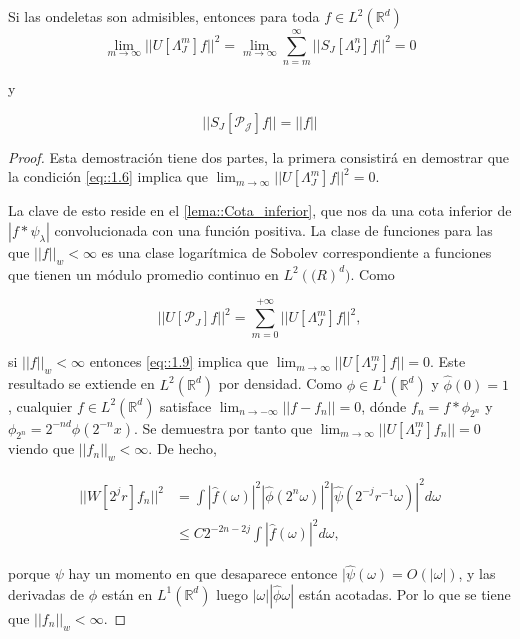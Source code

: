 \begin{teorema} \label{teoremaOndeletasAdmisibles}
\noindent Si las ondeletas son admisibles, entonces para toda $f\in L^2(\mathbb{R}^d)$
\begin{equation}
  \lim_{m\rightarrow\infty} ||U[\Lambda_J^m]f||^2=\lim_{m\rightarrow\infty} \sum_{n=m}^{\infty} ||S_J[\Lambda_J^n]f||^2=0
\end{equation}

y

\begin{equation}
  ||S_J[\mathcal{P_J}]f||=||f||
\end{equation}

\end{teorema}

\begin{proof}
  Esta demostración tiene dos partes, la primera consistirá en demostrar que la condición \eqref{eq::1.6} implica que $\lim_{m\rightarrow \infty} ||U[\Lambda_J^m]f||^2=0$. 
  
  \medskip

  \noindent La clave de esto reside en el \autoref{lema::Cota_inferior}, que nos da una cota inferior de $|f\ast\psi_\lambda|$ convolucionada con una función positiva. La clase de funciones para las que $||f||_w < \infty$ es una clase logarítmica de Sobolev correspondiente a funciones que tienen un módulo promedio continuo en $L^2(\mathbb(R)^d)$. Como 

  $$ || U[\mathcal{P}_J]f ||^2= \sum_{m=0}^{+\infty} ||U[\Lambda_J^m]f||^2,$$

  \noindent si $||f||_w < \infty$ entonces \eqref{eq::1.9} implica que $\lim_{m\rightarrow\infty}||U[\Lambda_J^m]f||= 0$. Este resultado se extiende en $L^2(\mathbb{R}^d)$ por densidad. Como $\phi \in L^1(\mathbb{R}^d)$ y $\widehat{\phi}(0)=1$, cualquier $f\in L^2(\mathbb{R}^d)$ satisface $\lim_{n\rightarrow - \infty} ||f-f_n||=0$, dónde $f_n=f \ast \phi_{2^n}$ y $\phi_{2^n}=2^{-nd} \phi(2^{-n}x)$. Se demuestra por tanto que $\lim_{m\rightarrow \infty} ||U[\Lambda_J^m]f_n||=0$ viendo que $||f_n||_w < \infty$. De hecho, 


  \begin{align*}
      ||W[2^jr]f_n||^2 &= \int |\widehat{f}(\omega)|^2 |\widehat{\phi}(2^n \omega)|^2 |\widehat{\psi}(2^{-j}r^{-1}\omega)|^2 d\omega \\
      &\leq C 2^{-2n-2j} \int |\widehat{f}(\omega)|^2 d\omega,
  \end{align*}

  \noindent porque $\psi$ hay un momento en que desaparece entonce $|\widehat{\psi}(\omega)=O(|\omega|)$, y las derivadas de $\phi$ están en $L^1(\mathbb{R}^d)$ luego $|\omega||\widehat{\phi}\omega|$ están acotadas. Por lo que se tiene que $||f_n||_w < \infty$.


\end{proof}
